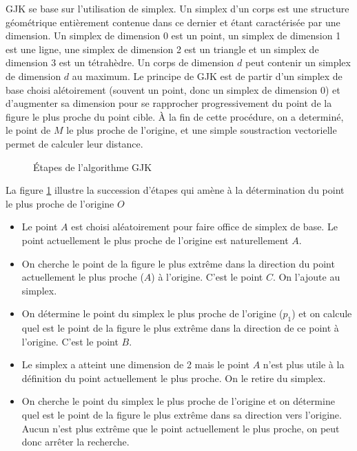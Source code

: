 GJK se base sur l'utilisation de simplex. Un simplex d'un corps est
une structure géométrique entièrement contenue dans ce dernier et
étant caractérisée par une dimension. Un simplex de dimension 0 est un
point, un simplex de dimension 1 est une ligne, une simplex de
dimension 2 est un triangle et un simplex de dimension 3 est un
tétrahèdre. Un corps de dimension $d$ peut contenir un simplex de
dimension $d$ au maximum. Le principe de GJK est de partir d'un
simplex de base choisi alétoirement (souvent un point, donc un simplex
de dimension 0) et d'augmenter sa dimension pour se rapprocher
progressivement du point de la figure le plus proche du point
cible. \`A la fin de cette procédure, on a determiné, le point de $M$
le plus proche de l'origine, et une simple soustraction vectorielle
permet de calculer leur distance.

\begin{figure}
  \centering

  \subfloat[]{  }
  \subfloat[]{  }
  \qquad
  \subfloat[]{  }
  \subfloat[]{  }
  \qquad
  \subfloat[]{  }
  \subfloat[]{  }

  \caption{{\'E}tapes de l'algorithme GJK}
  \label{gjk}
\end{figure}

La figure \ref{gjk} illustre la succession d'étapes qui amène à la
détermination du point le plus proche de l'origine $O$

\begin{itemize}
\item Le point $A$ est choisi aléatoirement pour faire office de
  simplex de base. Le point actuellement le plus proche de l'origine
  est naturellement $A$.
\item On cherche le point de la figure le plus extrême dans la
  direction du point actuellement le plus proche ($A$) à
  l'origine. C'est le point $C$. On l'ajoute au simplex.
\item On détermine le point du simplex le plus proche de l'origine
  ($p_1$) et on calcule quel est le point de la figure le plus extrême
  dans la direction de ce point à l'origine. C'est le point $B$.
\item Le simplex a atteint une dimension de 2 mais le point $A$ n'est
  plus utile à la définition du point actuellement le plus proche. On
  le retire du simplex.
\item On cherche le point du simplex le plus proche de l'origine et on
  détermine quel est le point de la figure le plus extrême dans sa
  direction vers l'origine. Aucun n'est plus extrême que le point
  actuellement le plus proche, on peut donc arrêter la recherche.
\end{itemize}

